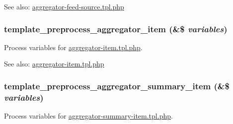 \begin{Desc}
\item[See also:]\hyperlink{aggregator-feed-source_8tpl_8php}{aggregator-feed-source.tpl.php} \end{Desc}
\hypertarget{aggregator_8pages_8inc_98e977c5fd28c4e808be5786a3f9e805}{
\subsubsection[{template\_\-preprocess\_\-aggregator\_\-item}]{\setlength{\rightskip}{0pt plus 5cm}template\_\-preprocess\_\-aggregator\_\-item (\&\$ {\em variables})}}
\label{aggregator_8pages_8inc_98e977c5fd28c4e808be5786a3f9e805}


Process variables for \hyperlink{aggregator-item_8tpl_8php}{aggregator-item.tpl.php}.

\begin{Desc}
\item[See also:]\hyperlink{aggregator-item_8tpl_8php}{aggregator-item.tpl.php} \end{Desc}
\hypertarget{aggregator_8pages_8inc_b60386a469193731ad719534bcdcac56}{
\subsubsection[{template\_\-preprocess\_\-aggregator\_\-summary\_\-item}]{\setlength{\rightskip}{0pt plus 5cm}template\_\-preprocess\_\-aggregator\_\-summary\_\-item (\&\$ {\em variables})}}
\label{aggregator_8pages_8inc_b60386a469193731ad719534bcdcac56}


Process variables for \hyperlink{aggregator-summary-item_8tpl_8php}{aggregator-summary-item.tpl.php}.

